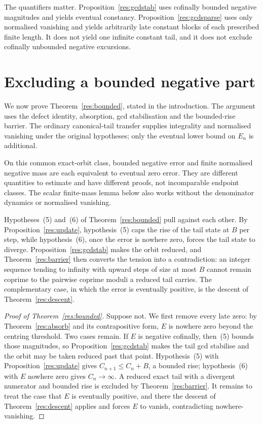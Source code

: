 \documentclass[11pt]{article}
\begin{document}
The quantifiers matter.  Proposition~\ref{res:gcdstab} uses cofinally bounded
negative magnitudes and yields eventual constancy.  Proposition~\ref{res:gcdsparse}
uses only normalised vanishing and yields arbitrarily late constant blocks of
each prescribed finite length.  It does not yield one infinite constant tail,
and it does not exclude cofinally unbounded negative excursions.

\section{Excluding a bounded negative part}\label{sec:bounded}

We now prove Theorem~\ref{res:bounded}, stated in the introduction.
The argument uses the defect identity, absorption, gcd stabilisation and the
bounded-rise barrier.  The ordinary canonical-tail transfer supplies
integrality and normalised vanishing under the original hypotheses; only
the eventual lower bound on $E_n$ is additional.

On this common exact-orbit class, bounded negative error and finite
normalised negative mass are each equivalent to eventual zero error.
They are different quantities to estimate and have different proofs, not
incomparable endpoint classes.  The scalar finite-mass lemma below also
works without the denominator dynamics or normalised vanishing.

Hypotheses~(5) and~(6) of Theorem~\ref{res:bounded} pull against each other.  By
Proposition~\ref{res:update}, hypothesis~(5) caps the rise of the tail state at
$B$ per step, while hypothesis~(6), once the error is nowhere zero, forces the
tail state to diverge.  Proposition~\ref{res:gcdstab} makes the orbit reduced,
and Theorem~\ref{res:barrier} then converts the tension into a contradiction:
an integer sequence tending to infinity with upward steps of size at most $B$
cannot remain coprime to the pairwise coprime moduli a reduced tail carries.
The
complementary case, in which the error is eventually positive, is the descent
of Theorem~\ref{res:descent}.

\begin{proof}[Proof of Theorem~\ref{res:bounded}]
Suppose not.  We first remove every late zero: by Theorem~\ref{res:absorb} and
its contrapositive form, $E$ is nowhere zero beyond the centring threshold.
Two cases remain.  If $E$ is negative cofinally,
then~(5) bounds those magnitudes, so Proposition~\ref{res:gcdstab} makes the
tail gcd stabilise and the orbit may be taken reduced past that point.
Hypothesis~(5) with
Proposition~\ref{res:update} gives $C_{n+1}\le C_n+B$, a bounded rise;
hypothesis~(6) with $E$ nowhere zero gives $C_n\to\infty$.  A reduced exact
tail with a divergent numerator and bounded rise is excluded by
Theorem~\ref{res:barrier}.  It remains to treat the case that $E$ is eventually
positive, and there the descent
of Theorem~\ref{res:descent} applies and forces $E$ to vanish, contradicting
nowhere-vanishing.
\end{proof}
\end{document}

